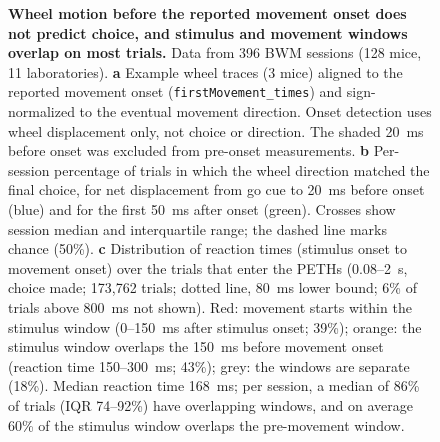 \FloatBarrier

\begin{figure}
\centering
{}
\caption{\textbf{Wheel motion before the reported movement onset does not predict choice, and stimulus and movement windows overlap on most trials.}
Data from 396 BWM sessions (128 mice, 11 laboratories).
\textbf{a} Example wheel traces (3 mice) aligned to the reported movement onset (\texttt{firstMovement\_times}) and sign-normalized to the eventual movement direction. Onset detection uses wheel displacement only, not choice or direction. The shaded 20~ms before onset was excluded from pre-onset measurements.
\textbf{b} Per-session percentage of trials in which the wheel direction matched the final choice, for net displacement from go cue to 20~ms before onset (blue) and for the first 50~ms after onset (green). Crosses show session median and interquartile range; the dashed line marks chance (50\%). \textbf{c} Distribution of reaction times (stimulus onset to movement onset) over the trials that enter the PETHs (0.08--2~s, choice made; 173,762 trials; dotted line, 80~ms lower bound; 6\% of trials above 800~ms not shown). Red: movement starts within the stimulus window (0--150~ms after stimulus onset; 39\%); orange: the stimulus window overlaps the 150~ms before movement onset (reaction time 150--300~ms; 43\%); grey: the windows are separate (18\%). Median reaction time 168~ms; per session, a median of 86\% of trials (IQR 74--92\%) have overlapping windows, and on average 60\% of the stimulus window overlaps the pre-movement window.
\label{fig:movement_onset_subthreshold_wheel}
}
\end{figure}

\FloatBarrier




\FloatBarrier

